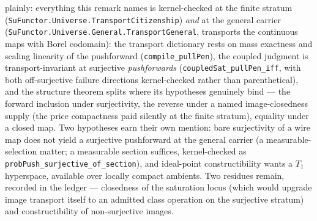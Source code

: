 \begin{remark}
plainly: everything this remark names is kernel-checked at the
finite stratum (\texttt{SuFunctor.Universe.TransportCitizenship})
\emph{and} at the general carrier
(\texttt{SuFunctor.Universe.General.TransportGeneral}, transports
the continuous maps with Borel codomain): the transport dictionary
rests on mass exactness and scaling linearity of the pushforward
(\texttt{compile\_pullPen}), the coupled judgment is
transport-invariant at surjective \emph{pushforwards}
(\texttt{coupledSat\_pullPen\_iff}, with both off-surjective
failure directions kernel-checked rather than parenthetical), and
the structure theorem splits where its hypotheses genuinely bind
--- the forward
inclusion under surjectivity, the reverse under a named
image-closedness supply (the price compactness paid silently at
the finite stratum), equality under a closed map. Two hypotheses
earn their own mention: bare surjectivity of a wire map does not
yield a surjective pushforward at the general carrier (a
measurable-selection matter; a measurable section suffices,
kernel-checked as \texttt{probPush\_surjective\_of\_section}), and
ideal-point constructibility wants a $T_1$ hyperspace, available
over locally compact ambients. Two residues
remain, recorded in the ledger --- closedness of the saturation locus
(which would upgrade
image transport itself to an admitted class operation on the
surjective
stratum) and constructibility of non-surjective images.
\end{remark}

